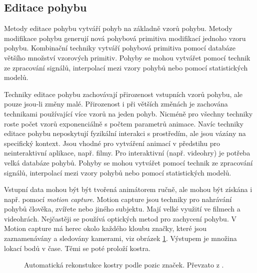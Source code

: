 \subsection{Editace pohybu}
Metody editace pohybu vytváří pohyb na základně vzorů pohybu. Metody modifikace pohybu generují nová pohybová primitiva modifikací jednoho vzoru pohybu. Kombinační techniky vytváří pohybová primitiva pomocí databáze většího množství vzorových primitiv. Pohyby se mohou vytvářet pomocí technik ze zpracování signálů, interpolací mezi vzory pohybů nebo pomocí statistických modelů. 

Techniky editace pohybu zachovávají přirozenost vstupních vzorů pohybu, ale pouze jsou-li změny malé. Přirozenost i při větších změnách je zachována technikami používající více vzorů na jeden pohyb. Nicméně pro všechny techniky roste počet vzorů  exponenciálně s počtem parametrů animace. Navíc techniky editace pohybu neposkytují fyzikální interakci s prostředím, ale jsou vázány na specifický kontext. Jsou vhodné pro vytváření animací v předstihu pro neinteraktivní aplikace, např. filmy. Pro interaktivní (např. videohry) je potřeba velká databáze pohybů. Pohyby se mohou vytvářet pomocí technik ze zpracování signálů, interpolací mezi vzory pohybů nebo pomocí statistických modelů.

Vstupní data mohou být být tvořená animátorem ručně, ale mohou být získána i např. pomocí \textit{motion capture}. Motion capture  \cite{motion_capture} jsou techniky pro nahrávání pohybů člověka, zvířete nebo jiného subjektu. Mají velké využití ve filmech a videohrách. Nejčastěji se používá optických metod pro zachycení pohybu. V Motion capture má herec okolo každého kloubu značky, které jsou zaznamenávány a sledovány kamerami, viz obrázek \ref{motion_capture_img}. Výstupem je množina lokací bodů v čase. Těmi se poté proloží kostra.
\begin{figure}[h]
\begin{center}
\caption{Automatická rekonstukce kostry podle pozic značek. Převzato z \cite{motion_capture}.} \label{motion_capture_img}
\end{center}
\end{figure}

